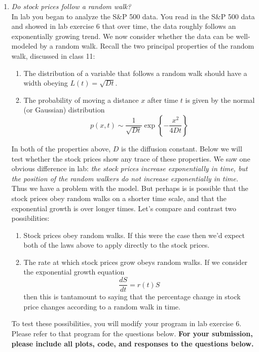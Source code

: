 \documentclass[12pt]{article}
\begin{document}
\begin{enumerate}
\item \textit{Do stock prices follow a random walk?}\\
\noindent In lab you began to analyze the S\&P 500 data.  You read in the S\&P 500 data and showed in lab exercise 6 that over time, the data roughly follows an exponentially growing trend.  We now consider whether the data can be well-modeled by a random walk.  Recall the two principal properties of the random walk, discussed in class 11: 
\begin{enumerate}
\item[-]
The distribution of a variable that follows a random walk should have a width obeying $L(t) = \sqrt{D t}$.
\item[-] The probability  of moving a distance $x$ after time $t$ is given by the normal (or Gaussian) distribution
\[
p(x,t) \sim \frac{1}{\sqrt{D t}} \exp \left\{-\frac{x^2}{4 D t} \right\}
\]
\end{enumerate}
\noindent In both of the properties above, $D$ is the diffusion constant.  Below we will test whether the stock prices show any trace of these properties.  We saw one obvious difference in lab:  \textit{the stock prices increase exponentially in time, but the position of the random walkers do not increase exponentially in time.}   Thus we have a problem with the model.  But perhaps is is possible that the stock prices obey random walks on a shorter time scale, and that the exponential growth is over longer times.  Let's compare and contrast two possibilities:
\begin{enumerate}
\item[-] Stock prices obey random walks.  If this were the case then we'd expect both of the laws above to apply directly to the stock prices.
\item[-] The rate at which stock prices grow obeys random walks.  If we consider the exponential growth equation
\[
\frac{d S}{d t} = r(t) S
\]
then this is tantamount to saying that the percentage change in stock price changes according to a random walk in time.
\end{enumerate}

\noindent To test these possibilities, you will modify your program in lab exercise 6.  Please refer to that program for the questions below.   \textbf{For your submission, please include all plots, code, and responses to the questions below. }


\end{enumerate}
\end{document}
